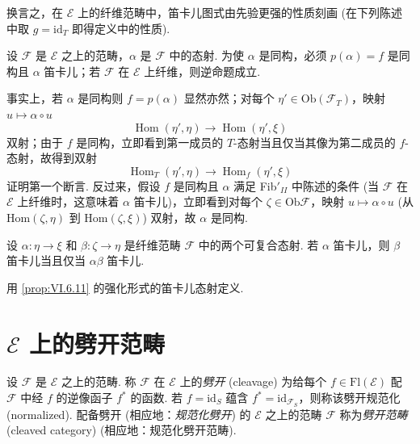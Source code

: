 换言之，在 $\mathcal{E}$ 上的纤维范畴中，笛卡儿图式由先验更强的性质刻画 (在下列陈述中取 $g = \mathrm{id}_T$ 即得定义中的性质).

\begin{corollary}\label{cor:VI.6.12}
设 $\mathcal{F}$ 是 $\mathcal{E}$ 之上的范畴，$\alpha$ 是 $\mathcal{F}$ 中的态射. 为使 $\alpha$ 是同构，必须 $p(\alpha) = f$ 是同构且 $\alpha$ 笛卡儿；若 $\mathcal{F}$ 在 $\mathcal{E}$ 上纤维，则逆命题成立.
\end{corollary}

事实上，若 $\alpha$ 是同构则 $f = p(\alpha)$ 显然亦然；对每个 $\eta' \in \mathrm{Ob}(\mathcal{F}_T)$，映射 $u \mapsto \alpha \circ u$
\[
\operatorname{Hom}(\eta', \eta) \longrightarrow \operatorname{Hom}(\eta', \xi)
\]
双射；由于 $f$ 是同构，立即看到第一成员的 $T$-态射当且仅当其像为第二成员的 $f$-态射，故得到双射
\[
\operatorname{Hom}_T(\eta', \eta) \longrightarrow \operatorname{Hom}_f(\eta', \xi)
\]
证明第一个断言. 反过来，假设 $f$ 是同构且 $\alpha$ 满足 Fib$'_{II}$ 中陈述的条件 (当 $\mathcal{F}$ 在 $\mathcal{E}$ 上纤维时，这意味着 $\alpha$ 笛卡儿)，立即看到对每个 $\zeta \in \mathrm{Ob} \mathcal{F}$，映射 $u \mapsto \alpha \circ u$ (从 Hom$(\zeta, \eta)$ 到 Hom$(\zeta, \xi)$) 双射，故 $\alpha$ 是同构.

\begin{corollary}\label{cor:VI.6.13}
设 $\alpha \colon \eta \to \xi$ 和 $\beta \colon \zeta \to \eta$ 是纤维范畴 $\mathcal{F}$ 中的两个可复合态射. 若 $\alpha$ 笛卡儿，则 $\beta$ 笛卡儿当且仅当 $\alpha\beta$ 笛卡儿.
\end{corollary}

用 \ref{prop:VI.6.11} 的强化形式的笛卡儿态射定义.

\section{\texorpdfstring{$\mathcal{E}$}{E} 上的劈开范畴}

\begin{definition}\label{def:VI.7.1}
设 $\mathcal{F}$ 是 $\mathcal{E}$ 之上的范畴. 称 $\mathcal{F}$ 在 $\mathcal{E}$ 上的\emph{劈开} (cleavage) 为给每个 $f \in \mathrm{Fl}(\mathcal{E})$ 配 $\mathcal{F}$ 中经 $f$ 的逆像函子 $f^{*}$ 的函数. 若 $f = \mathrm{id}_S$ 蕴含 $f^{*} = \mathrm{id}_{\mathcal{F}_S}$，则称该劈开规范化 (normalized). 配备劈开 (相应地：\emph{规范化劈开}) 的 $\mathcal{E}$ 之上的范畴 $\mathcal{F}$ 称为\emph{劈开范畴} (cleaved category) (相应地：规范化劈开范畴).
\end{definition}

